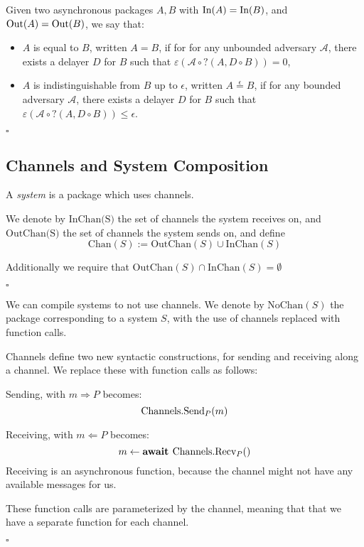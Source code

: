 \begin{definition}
  Given two asynchronous packages $A, B$ with $\text{In}(A) = \text{In}(B)$,
  and $\text{Out}(A) = \text{Out}(B)$, we say that:
  \begin{itemize}
    \item $A$ is equal to $B$, written $A = B$, if for for any unbounded adversary $\mathcal{A}$,
    there exists a delayer $D$ for $B$ such that $\varepsilon(\mathcal{A} \circ ?(A, D \circ B)) = 0$,
    \item $A$ is indistinguishable from $B$ up to $\epsilon$, written $A \overset{\epsilon}{=} B$,
    if for any bounded adversary $\mathcal{A}$,
    there exists a delayer $D$ for $B$ such that $\varepsilon(\mathcal{A} \circ ?(A, D \circ B)) \leq \epsilon$.
  \end{itemize}

  $\square$
\end{definition}

\subsection{Channels and System Composition}


\begin{definition}[Systems]
A \emph{system} is a package which uses channels.

We denote by $\text{InChan(S)}$ the set of channels the system receives on,
and $\text{OutChan(S)}$ the set of channels the system sends on,
and define
$$
\text{Chan}(S) := \text{OutChan}(S) \cup \text{InChan}(S)
$$

Additionally we require that $\text{OutChan}(S) \cap \text{InChan}(S) = \emptyset$

$\square$
\end{definition}

\begin{definition}
We can compile systems to not use channels.
We denote by $\text{NoChan}(S)$ the package corresponding to
a system $S$, with the use of channels replaced with function calls.

Channels define two new syntactic constructions, for sending and receiving
along a channel.
We replace these with function calls as follows:


Sending, with $m \Rightarrow P$ becomes:
$$
\text{Channels}.\text{Send}_P(m)
$$

Receiving, with $m \Leftarrow P$ becomes:
$$
m \gets \textbf{await } \text{Channels}.\text{Recv}_P()
$$
Receiving is an asynchronous function, because the channel might not have
any available messages for us.

These function calls are parameterized by the channel, meaning
that that we have a separate function for each channel.

$\square$
\end{definition}

